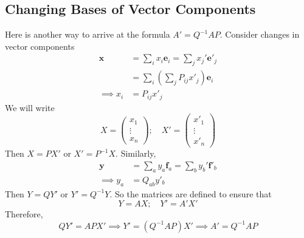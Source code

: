 \documentclass{article}
\begin{document}
\subsection{Changing Bases of Vector Components}
Here is another way to arrive at the formula $A' = Q^{-1}AP$. Consider changes in vector components
\begin{align*}
	\bm x        & = \sum_i x_i \bm e_i = \sum_j x_j' \bm e'_j       \\
	             & = \sum_i\left( \sum_j P_{ij} x'_j \right) \bm e_i \\
	\implies x_i & = P_{ij} x'_j
\end{align*}
We will write
\[ X = \begin{pmatrix}
		x_1 \\ \vdots \\ x_n
	\end{pmatrix};\quad X' = \begin{pmatrix}
		x'_1 \\ \vdots \\ x'_n
	\end{pmatrix} \]
Then $X = PX'$ or $X' = P^{-1}X$. Similarly,
\begin{align*}
	\bm y        & = \sum_a y_a \bm f_a = \sum_b y_b' \bm f'_b \\
	\implies y_a & = Q_{ab} y'_b
\end{align*}
Then $Y = QY'$ or $Y' = Q^{-1}Y$. So the matrices are defined to ensure that
\[ Y = AX;\quad Y' = A'X' \]
Therefore,
\[ QY' = APX' \implies Y' = (Q^{-1}AP)X' \implies A' = Q^{-1}AP \]
\end{document}
